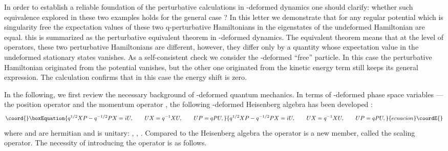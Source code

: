\documentclass[a4paper,12pt]{article}
\begin{document}
In order to establish a reliable foundation of  the perturbative 
calculations in \coordHE{}-deformed dynamics  one should clarify: 
whether such equivalence explored in these two examples holds for the 
general case ?
In this letter we demonstrate that for any regular potential  which is 
singularity free the expectation values
 of these two q-perturbative Hamiltonians in the eigenstates of the 
undeformed  Hamiltonian are equal. this is summarized as the perturbative 
equivalent theorem in \coordHE{}-deformed dynamics. 
The equivalent theorem means that at the level of operators, 
these two perturbative Hamiltonians are different, however, they differ only 
by a quantity whose expectation value in the undeformed stationary states
 vanishes.
As a self-consistent  check we consider the  \coordHE{}-deformed ``free'' particle. 
In this case the  perturbative Hamiltonian  originated from the potential 
vanishes, 
but the other one originated from the kinetic energy term still keeps its 
general expression. 
The calculation confirms that in this case the energy shift is zero. 

   In the following, we first review the necessary background of \coordHE{}-deformed 
quantum mechanics.
In terms of \coordHE{}-deformed phase space variables --- 
the position operator \coordHE{} and the momentum operator \coordHE{}, 
the following \coordHE{}-deformed Heisenberg algebra has been
developed \cite{Hebecker, Fichtmuller}:
\begin{equation}\coord{}\boxEquation{
\label{Eq:q-algebra}
q^{1/2}XP-q^{-1/2}PX=iU, \qquad    
UX=q^{-1}XU, \qquad
UP=qPU,
}{
q^{1/2}XP-q^{-1/2}PX=iU, \qquad    
UX=q^{-1}XU, \qquad
UP=qPU,
}{ecuacion}\coordE{}\end{equation}
where \coordHE{} and \coordHE{} are hermitian and \coordHE{} is unitary:
\coordHE{}, \coordHE{}, \coordHE{}.
Compared to the Heisenberg algebra the operator \coordHE{} is a new member, 
called the scaling operator. 
The necessity of introducing the operator \coordHE{} is as follows. 
\end{document}
